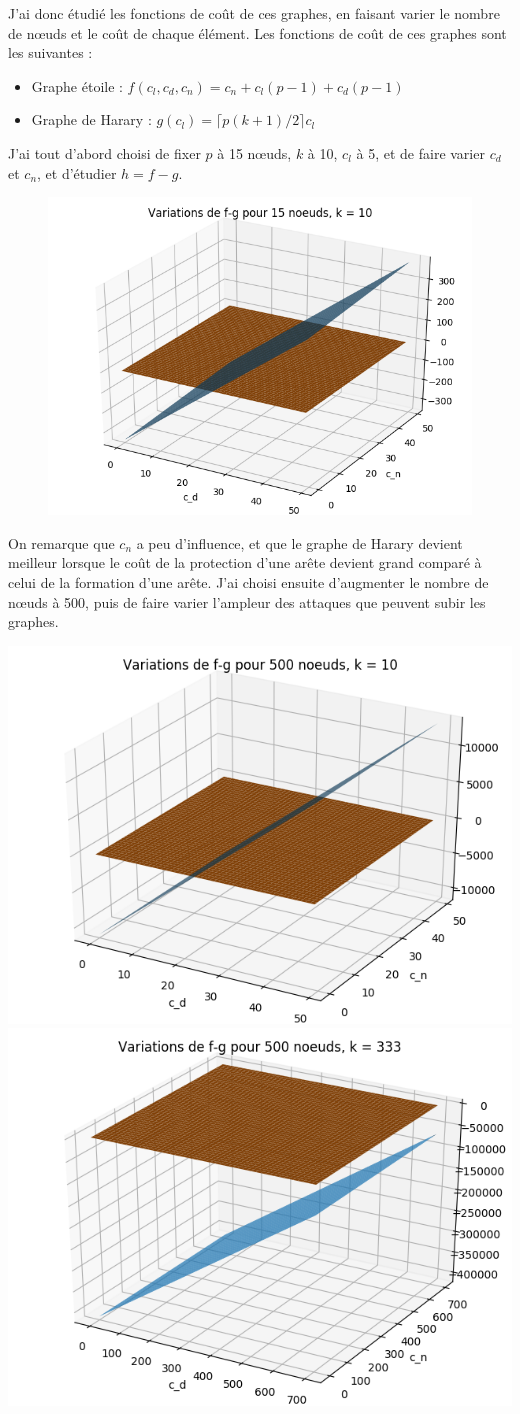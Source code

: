 \documentclass[12pt,a4paper]{article}
\begin{document}
J'ai donc étudié les fonctions de coût de ces graphes, en faisant varier le nombre de nœuds et le coût de chaque élément. Les fonctions de coût de ces graphes sont les suivantes :
\begin{itemize}
\item Graphe étoile : $f(c_{l},c_{d},c_{n}) = c_{n} + c_{l}(p-1) + c_{d}(p-1)$
\item Graphe de Harary : $g(c_{l}) = \lceil p(k+1)/2 \rceil c_{l}$
\end{itemize}

J'ai tout d'abord choisi de fixer $p$ à 15 nœuds, $k$ à 10, $c_{l}$ à 5, et de faire varier $c_{d}$ et $c_{n}$, et d'étudier $h = f-g$.
\begin{figure}[h]
	\centering
		\includegraphics[width=0.49\linewidth]{15noeuds10atk.png}
\end{figure}

On remarque que $c_{n}$ a peu d'influence, et que le graphe de Harary devient meilleur lorsque le coût de la protection d'une arête devient grand comparé à celui de la formation d'une arête.
J'ai choisi ensuite d'augmenter le nombre de nœuds à 500, puis de faire varier l'ampleur des attaques que peuvent subir les graphes.

\begin{center}
\includegraphics[width=0.49\linewidth]{500noeuds10atk.png}
\includegraphics[width=0.49\linewidth]{500noeuds333atk.png}
\end{center}
\end{document}
